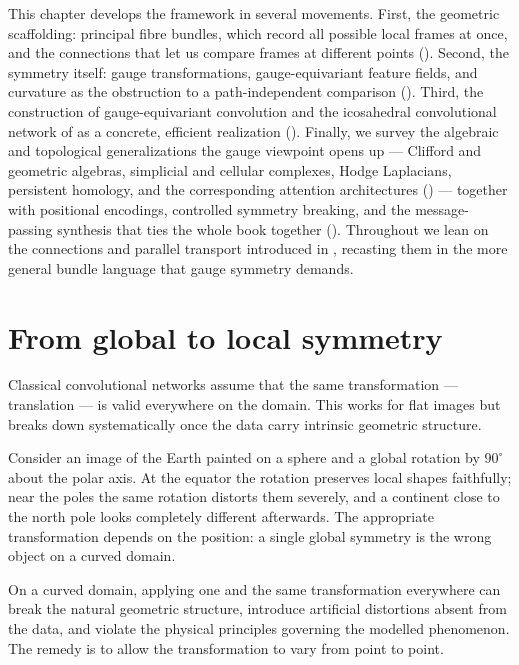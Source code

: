 This chapter develops the framework in several movements. First, the geometric
scaffolding: principal fibre bundles, which record all possible local frames at
once, and the connections that let us compare frames at different points
(). Second, the symmetry itself:
gauge transformations, gauge-equivariant feature fields, and curvature as the
obstruction to a path-independent comparison
(). Third, the construction of
gauge-equivariant convolution and the icosahedral convolutional network of
\citet{cohen2019gaugeequivariantconvolutional} as a concrete, efficient
realization (). Finally, we survey the algebraic and
topological generalizations the gauge viewpoint opens up --- Clifford and
geometric algebras, simplicial and cellular complexes, Hodge Laplacians,
persistent homology, and the corresponding attention architectures
() --- together with positional
encodings, controlled symmetry breaking, and the message-passing synthesis that
ties the whole book together
(). Throughout we lean on the
connections and parallel transport introduced in , recasting
them in the more general bundle language that gauge symmetry demands.

\section{From global to local symmetry}
\label{sec:gauge:local}

Classical convolutional networks assume that the same transformation ---
translation --- is valid everywhere on the domain. This works for flat images
but breaks down systematically once the data carry intrinsic geometric
structure.

\begin{example}
\label{ex:gauge:sphere-rotation}
Consider an image of the Earth painted on a sphere and a global rotation by
$90^\circ$ about the polar axis. At the equator the rotation preserves local
shapes faithfully; near the poles the same rotation distorts them severely, and
a continent close to the north pole looks completely different afterwards. The
appropriate transformation depends on the position: a single global symmetry is
the wrong object on a curved domain.
\end{example}

On a curved domain, applying one and the same transformation everywhere can
break the natural geometric structure, introduce artificial distortions absent
from the data, and violate the physical principles governing the modelled
phenomenon. The remedy is to allow the transformation to vary from point to
point.

